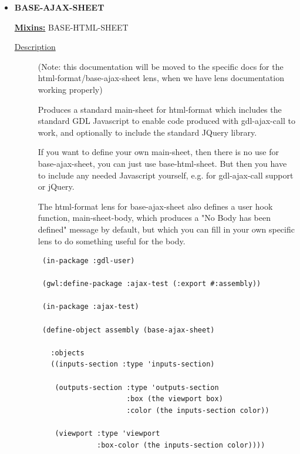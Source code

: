 \documentclass [11pt]{book}
\begin{document}
\begin{itemize}
\item {}
\textbf{BASE-AJAX-SHEET}


\textbf{
\underline{Mixins:}} BASE-HTML-SHEET





\begin{description}

\item [
\underline{Description}]


(Note: this documentation will be moved
to the specific docs for the html-format/base-ajax-sheet lens, when 
we have lens documentation working properly)

Produces a standard main-sheet for html-format which includes the
standard GDL Javascript to enable code produced with gdl-ajax-call to
work, and optionally to include the standard JQuery library.

If you want to define your own main-sheet, then there is no use for
base-ajax-sheet, you can just use base-html-sheet. But then you have
to include any needed Javascript yourself, e.g. for gdl-ajax-call
support or jQuery.

The html-format lens for base-ajax-sheet also defines a user hook function,
main-sheet-body, which produces a "No Body has been defined" message by default, 
but which you can fill in your own specific lens to do something useful for the body.



\end{description}




\begin{figure}
\begin{lrbox}{\boxedverb}
\begin{minipage}{\linewidth}
{\small

\begin{verbatim}
 (in-package :gdl-user)

 (gwl:define-package :ajax-test (:export #:assembly))

 (in-package :ajax-test)

 (define-object assembly (base-ajax-sheet)

   :objects
   ((inputs-section :type 'inputs-section)
   
    (outputs-section :type 'outputs-section
                     :box (the viewport box)
                     :color (the inputs-section color))
   
    (viewport :type 'viewport
              :box-color (the inputs-section color))))


\end{verbatim}}
\end{minipage}
\end{lrbox}
\end{figure}
\end{itemize}
\end{document}
